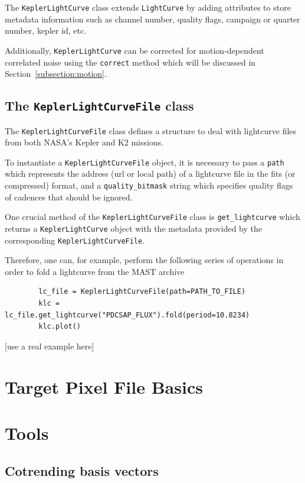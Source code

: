 \documentclass{article}
\begin{document}
       The \texttt{KeplerLightCurve} class extends \texttt{LightCurve} by
       adding attributes to store metadata information such as channel number,
       quality flags, campaign or quarter number, kepler id, etc.

       Additionally, \texttt{KeplerLightCurve} can be corrected for motion-dependent
       correlated noise using the \texttt{correct} method which will be discussed in
       Section~\ref{subsection:motion}.

   \subsection{The \texttt{KeplerLightCurveFile} class}
        The \texttt{KeplerLightCurveFile} class defines a structure to deal
        with lightcurve files from both NASA's Kepler and K2 missions.

        To instantiate a \texttt{KeplerLightCurveFile} object, it is necessary
        to pass a \texttt{path} which represents the address (url or local path)
        of a lightcurve file in the fits (or compressed) format, and a
        \texttt{quality\_bitmask} string which specifies quality
        flags of cadences that should be ignored.

        One crucial method of the \texttt{KeplerLightCurveFile} class is
        \texttt{get\_lightcurve} which returns a \texttt{KeplerLightCurve} object
        with the metadata provided by the corresponding \texttt{KeplerLightCurveFile}.

        Therefore, one can, for example, perform the following series of operations
        in order to fold a lightcurve from the MAST archive
        \begin{verbatim}
        lc_file = KeplerLightCurveFile(path=PATH_TO_FILE)
        klc = lc_file.get_lightcurve("PDCSAP_FLUX").fold(period=10.8234)
        klc.plot()
        \end{verbatim}
        [use a real example here]

\section{Target Pixel File Basics}

\section{Tools}

\subsection{Cotrending basis vectors}
\end{document}
